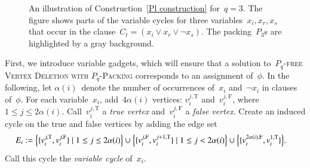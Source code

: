 \documentclass[envcountsame,numbook,smallextended]{svjour3}
\numberwithin{equation}{section}
\numberwithin{figure}{section}
\newcommand{\occ}{\ensuremath{\alpha}}
\newcommand{\PLVD}{\textsc{\ensuremath{P_q}-free Vertex Deletion with  \ensuremath{P_q}-Packing}}
\begin{document}
\begin{construction}
\begin{figure}[t]

  \caption{An illustration of Construction~\ref{Pl construction} for~$q=3$. The figure shows parts of the variable cycles for three variables~$x_i,x_r,x_s$ that occur in the clause~$C_t=(x_i\vee x_r\vee \neg x_s)$. The packing~$P_3$s are highlighted by a gray background.}
  \label{fig:pq-cons}

\end{figure}  


  First,
  we introduce variable gadgets,
  which will ensure that a solution to~\PLVD{}
  corresponds to an assignment of~$\phi$.
  In the following,
  let $\occ(i)$~denote
  the number of occurrences of~$x_i$ and~$\neg x_i$
  in clauses of~$\phi$.
  For each variable~$x_i$, add~$4\occ(i)$ vertices:
  $v_{i}^{j,\text{T}}$ and~$v_{i}^{j,\text{F}}$,
  where~$1\le j\le 2\occ(i)$.
  Call~$v_i^{j,\text{T}}$ a \emph{true vertex}
  and~$v_i^{j,\text{F}}$ a \emph{false vertex}.
  Create an induced cycle on the true and false vertices
  by adding the edge set
  \begin{align*}
    E_i:={}& \Bigl\{\{v_i^{j,\text{T}},v_i^{j,\text{F}}\}
             \mid 1\le j\le 2\occ(i)\Bigr\}
             \cup
             \Bigl\{\{v_i^{j,\text{F}},v_i^{j+1,\text{T}}\}
             \mid 1\le j< 2\occ(i)\Bigr\}
             \cup
             \Bigl\{\{v_i^{2\occ(i),\text{F}},v_i^{1,\text{T}}\}\Bigr\}.
  \end{align*}
  Call this cycle the \emph{variable cycle} of~$x_i$.
  

\end{construction}
\end{document}
